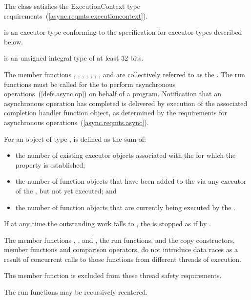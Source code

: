 \pnum
The class  satisfies the ExecutionContext type requirements~(\ref{async.reqmts.executioncontext}).

%
\pnum
{} is an executor type conforming to the specification for  executor types described below.

%
\pnum
{} is an 
unsigned integral type of at least 32 bits.

\pnum
The  member functions , , , , , , , and  are collectively referred to as the . The run functions must be called for the  to perform asynchronous operations~(\ref{defs.async.op}) on behalf of a \Cpp program. Notification that an asynchronous operation has completed is delivered by execution of the associated completion handler function object, as determined by the requirements for asynchronous operations~(\ref{async.reqmts.async}).

\pnum
For an object of type ,  is defined as the sum of:

\begin{itemize}
\item
the number of existing executor objects associated with the  for which the  property is established;
\item
the number of function objects that have been added to the  via any executor of the , but not yet executed; and
\item
the number of function objects that are currently being executed by the .
\end{itemize}

\pnum
If at any time the outstanding work falls to , the  is stopped as if by .

\pnum
The  member functions , , and , the run functions, and the  copy constructors, member functions and comparison operators, do not introduce data races as a result of concurrent calls to those functions from different threads of execution. \begin{note} The  member function is excluded from these thread safety requirements. \end{note}
The run functions may be recursively reentered.


